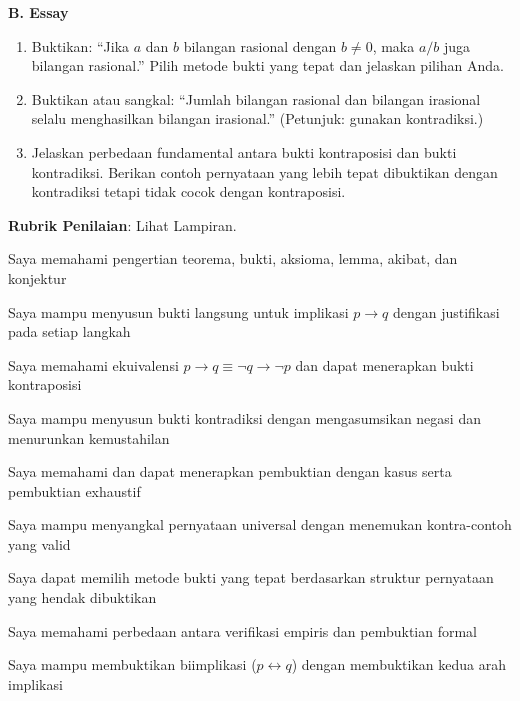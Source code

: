 \documentclass[../main]{subfiles}
\begin{document}
\begin{asesmen}
\textbf{B. Essay}
\begin{enumerate}
  \item Buktikan: ``Jika $a$ dan $b$ bilangan rasional dengan $b \neq 0$, maka $a/b$ juga bilangan rasional.'' Pilih metode bukti yang tepat dan jelaskan pilihan Anda.
  \item Buktikan atau sangkal: ``Jumlah bilangan rasional dan bilangan irasional selalu menghasilkan bilangan irasional.'' (Petunjuk: gunakan kontradiksi.)
  \item Jelaskan perbedaan fundamental antara bukti kontraposisi dan bukti kontradiksi. Berikan contoh pernyataan yang lebih tepat dibuktikan dengan kontradiksi tetapi tidak cocok dengan kontraposisi.
\end{enumerate}

\textbf{Rubrik Penilaian}: Lihat Lampiran.
\end{asesmen}


\begin{checklist}
  \item Saya memahami pengertian teorema, bukti, aksioma, lemma, akibat, dan konjektur
  \item Saya mampu menyusun bukti langsung untuk implikasi $p \rightarrow q$ dengan justifikasi pada setiap langkah
  \item Saya memahami ekuivalensi $p \rightarrow q \equiv \neg q \rightarrow \neg p$ dan dapat menerapkan bukti kontraposisi
  \item Saya mampu menyusun bukti kontradiksi dengan mengasumsikan negasi dan menurunkan kemustahilan
  \item Saya memahami dan dapat menerapkan pembuktian dengan kasus serta pembuktian exhaustif
  \item Saya mampu menyangkal pernyataan universal dengan menemukan kontra-contoh yang valid
  \item Saya dapat memilih metode bukti yang tepat berdasarkan struktur pernyataan yang hendak dibuktikan
  \item Saya memahami perbedaan antara verifikasi empiris dan pembuktian formal
  \item Saya mampu membuktikan biimplikasi ($p \leftrightarrow q$) dengan membuktikan kedua arah implikasi
\end{checklist}

\end{document}
